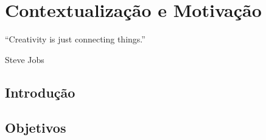 \chapter{Contextualização e Motivação}


\begin{flushright}
	\begin{quotebox50}
		\large
		“Creativity is just connecting things.”

		\tcblower
		Steve Jobs
	\end{quotebox50}
\end{flushright}

\section{Introdução}

\section{Objetivos}

